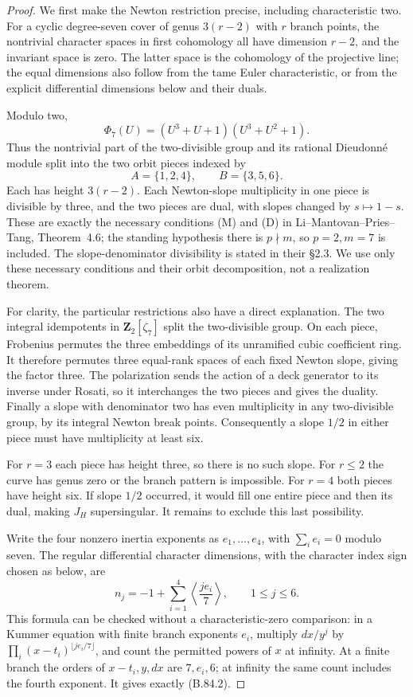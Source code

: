 \begin{proof}
We first make the Newton restriction precise, including characteristic
two. For a cyclic degree-seven cover of genus $3(r-2)$ with $r$
branch points, the nontrivial character spaces in first cohomology
all have dimension $r-2$, and the invariant space is zero. The latter
space is the cohomology of the projective line; the equal dimensions
also follow from the tame Euler characteristic, or from the explicit
differential dimensions below and their duals.

Modulo two,
\[
 \Phi_7(U)=(U^3+U+1)(U^3+U^2+1).
\]
Thus the nontrivial part of the two-divisible group and its rational
Dieudonn\'e module split into the two orbit pieces indexed by
\[
                A=\{1,2,4\},\qquad B=\{3,5,6\}.
\]
Each has height $3(r-2)$. Each Newton-slope multiplicity in one
piece is divisible by three, and the two pieces are dual, with
slopes changed by $s\mapsto1-s$. These are exactly the necessary
conditions (M) and (D) in Li--Mantovan--Pries--Tang, Theorem~4.6;
the standing hypothesis there is $p\nmid m$, so $p=2,m=7$ is
included. The slope-denominator divisibility is stated
in their \S2.3. We use only these necessary conditions and their
orbit decomposition, not a realization theorem.
\citep[\S2.3 and Theorem~4.6, conditions (D), (M)]{LMPT2019}

For clarity, the particular restrictions also have a direct explanation.
The two integral idempotents in $\mathbf Z_2[\zeta_7]$ split the
two-divisible group. On each piece, Frobenius permutes the three
embeddings of its unramified cubic coefficient ring. It therefore
permutes three equal-rank spaces of each fixed Newton slope, giving
the factor three. The polarization sends the action of a deck
generator to its inverse under Rosati, so it interchanges the two
pieces and gives the duality. Finally a slope with denominator two
has even multiplicity in any two-divisible group, by its integral
Newton break points. Consequently a slope $1/2$ in either piece
must have multiplicity at least six.

For $r=3$ each piece has height three, so there is no such slope.
For $r\le2$ the curve has genus zero or the branch pattern is
impossible. For $r=4$ both pieces have height six. If slope $1/2$
occurred, it would fill one entire piece and then its dual, making
$J_H$ supersingular. It remains to exclude this last possibility.

Write the four nonzero inertia exponents as $e_1,\ldots,e_4$,
with $\sum_i e_i=0$ modulo seven. The regular differential character
dimensions, with the character index sign chosen as below, are
\[
             n_j=-1+\sum_{i=1}^4
                        \left\langle\frac{j e_i}{7}\right\rangle,
                   \qquad 1\le j\le6.                       \tag{B.84.2}
\]
This formula can be checked without a characteristic-zero comparison:
in a Kummer equation with finite branch exponents $e_i$, multiply
$dx/y^j$ by $\prod_i(x-t_i)^{\lfloor je_i/7\rfloor}$, and count
the permitted powers of $x$ at infinity. At a finite branch the
orders of $x-t_i,y,dx$ are $7,e_i,6$; at infinity the same count
includes the fourth exponent. It gives exactly (B.84.2).


\end{proof}
